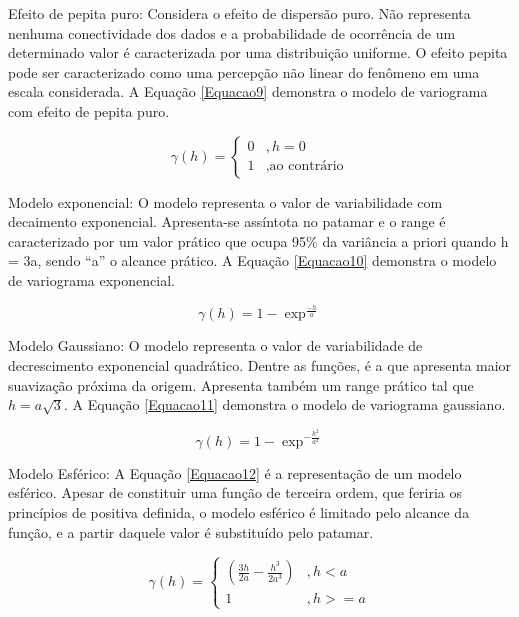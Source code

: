 Efeito de pepita puro: Considera o efeito de dispersão puro. Não representa nenhuma conectividade dos dados e a probabilidade de ocorrência de um determinado valor é caracterizada por uma distribuição uniforme. O efeito pepita pode ser caracterizado como uma percepção não linear do fenômeno em uma escala considerada. A Equação \ref{Equacao9} demonstra o modelo de variograma com efeito de pepita puro.

\begin{equation}\label{Equacao9}
\gamma(h) = \begin{cases}
0 & , h =0 \\
1 &,\text{ao contrário}
\end{cases}
\end{equation}


Modelo exponencial: O modelo representa o valor de variabilidade com decaimento exponencial. Apresenta-se assíntota no patamar e o range é caracterizado por um valor prático que ocupa 95\% da variância a priori quando h = 3a, sendo “a” o alcance prático. A Equação \ref{Equacao10} demonstra o modelo de variograma exponencial.

\begin{equation}\label{Equacao10}
\gamma(h) = 1 - \exp^{\frac{-h}{a}}
\end{equation}

Modelo Gaussiano: O modelo representa o valor de variabilidade de decrescimento exponencial quadrático. Dentre as funções, é a que apresenta maior suavização próxima da origem. Apresenta também um range prático tal que $h=a\sqrt{3}$. A Equação \ref{Equacao11} demonstra o modelo de variograma gaussiano.

\begin{equation}\label{Equacao11}
\gamma(h) = 1 - \exp^{-\frac{h^2}{a^2}}
\end{equation}

Modelo Esférico: A Equação \ref{Equacao12} é a representação de um modelo esférico. Apesar de constituir uma função de terceira ordem, que feriria os princípios de positiva definida, o modelo esférico é limitado pelo alcance da função, e a partir daquele valor é substituído pelo patamar. 

\begin{equation}\label{Equacao12}
\gamma(h) = \begin{cases}
\left( \frac{3h}{2a} - \frac{h^3}{2a^3} \right)  &, h < a \\
1 & , h >= a
\end{cases}
\end{equation}

